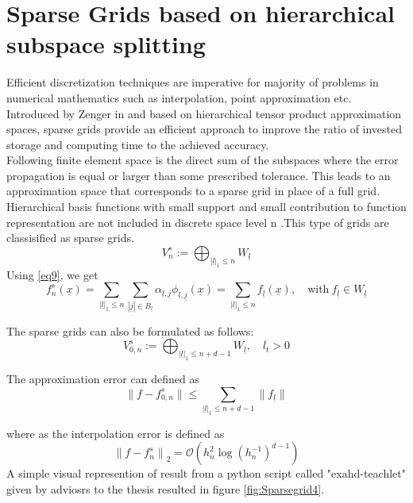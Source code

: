 \section{Sparse Grids based on hierarchical subspace splitting}
 Efficient discretization techniques are imperative for majority of problems in numerical mathematics such as interpolation, point approximation etc. Introduced by Zenger in \cite{Zenger1990} and based on hierarchical tensor product approximation spaces, sparse grids provide an efficient approach to improve the ratio of invested storage and computing time to the achieved accuracy.\cite{Bungartz1998}\\
  Following \cite{Zenger1990} finite element space is the direct sum of the subspaces where the error propagation is equal or larger than some prescribed tolerance. This leads to an approximation space that corresponds to a sparse grid in place of a full grid.\\
Hierarchical basis functions with small support and small contribution to function representation are not included in discrete space level n .This type of grids are classisified as sparse grids. 
\begin{equation}
    V_{n}^s := \bigoplus_{|\underline{l}|_1\le n} W_{\underline{l}}
\end{equation}
Using \eqref{eq9}, we get 
\begin{equation}
    f_{n}^s \left(\underline{x}\right) 
    = \sum_{|\underline{l}|_1\le n} \sum_{|\underline{j}|\in B_{\underline{l}}} \alpha_{\underline{l},\underline{j}}\phi_{\underline{l},\underline{j}}\left(\underline{x}\right) 
    = \sum_{|\underline{l}|_1\le n} f_{\underline{l}}(\underline{x}), \quad \text{with} \ f_{\underline{l}} \in W_{\underline{l}}
\end{equation}

The sparse grids can also be formulated as follows:
\begin{equation}
    V_{0,n}^s := \bigoplus_{|\underline{l}|_1\le n+d-1} W_{\underline{l}}, \quad l_t > 0
\end{equation}

The approximation error can defined as
\begin{equation}
	\parallel f - f_{0,n}^s \parallel \le \sum_{|\underline{l}|_1\le n+d-1} \parallel f_{\underline{l}}\parallel
\end{equation}

where as the interpolation error is defined as 
\begin{equation}
	{\parallel f - f_{n}^s \parallel}_{2} = \mathcal{O}\left(h_n^2\log{}(h_{n}^{-1})^{d-1} \right)
\end{equation}
A simple visual represention of result from a python script called "exahd-teachlet" given by adviosrs to the thesis resulted in figure \ref{fig:Sparsegrid4}.

